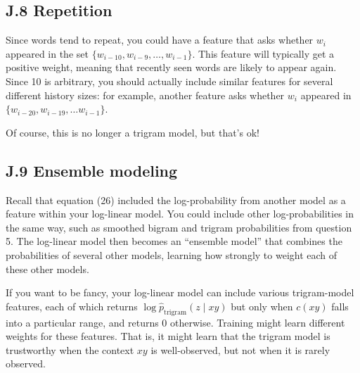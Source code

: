 \subsection*{J.8 Repetition}

Since words tend to repeat, you could have a feature that asks whether $w_i$ appeared in the set $\{w_{i-10}, w_{i-9}, \ldots, w_{i-1}\}$. 
This feature will typically get a positive weight, meaning that recently seen words are likely to appear again. 
Since 10 is arbitrary, you should actually include similar features for several different history sizes: for 
example, another feature asks whether $w_i$ appeared in $\{w_{i-20}, w_{i-19}, \ldots w_{i-1}\}$. 

Of course, this is no longer a trigram model, but that’s ok! 

\subsection*{J.9 Ensemble modeling}

Recall that equation (26) included the log-probability from another model as a feature within your log-linear 
model. You could include other log-probabilities in the same way, such as smoothed bigram and trigram 
probabilities from question 5. The log-linear model then becomes an “ensemble model” that combines the 
probabilities of several other models, learning how strongly to weight each of these other models. 

If you want to be fancy, your log-linear model can include various trigram-model features, each of 
which returns $\log \hat{p}_{\text{trigram}}(z \mid xy)$ but only when $c(xy)$ falls into a particular range, and returns 0 otherwise. 
Training might learn different weights for these features. That is, it might learn that the trigram model is 
trustworthy when the context $xy$ is well-observed, but not when it is rarely observed. 




